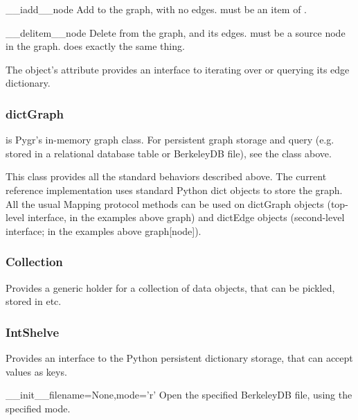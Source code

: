 \documentclass{howto}
\begin{document}
\begin{funcdesc}{__iadd__}{node}
  Add  to the graph, with no edges.   must be an
  item of .
\end{funcdesc}

\begin{funcdesc}{__delitem__}{node}
  Delete  from the graph, and its edges.   must be a
  source node in the graph.   does exactly the same thing.
\end{funcdesc}


The object's  attribute provides an interface to iterating
over or querying its edge dictionary.

\subsubsection{dictGraph}

 is Pygr's in-memory graph class.  For persistent
graph storage and query (e.g. stored in a relational database table
or BerkeleyDB file), see the  class above.

This class provides all the standard behaviors described above.  The current reference implementation uses standard Python dict objects to store the graph.  All the usual Mapping protocol methods can be used on dictGraph objects (top-level interface, in the examples above graph) and dictEdge objects (second-level interface; in the examples above graph[node]).

\subsubsection{Collection}
Provides a generic holder for a collection of data objects, that can be
pickled, stored in  etc.

\subsubsection{IntShelve}
Provides an interface to the Python  persistent dictionary
storage, that can accept  values as keys.
\begin{funcdesc}{__init__}{filename=None,mode='r'}
  Open the specified  BerkeleyDB file, using the specified
  mode.
\end{funcdesc}
\end{document}
